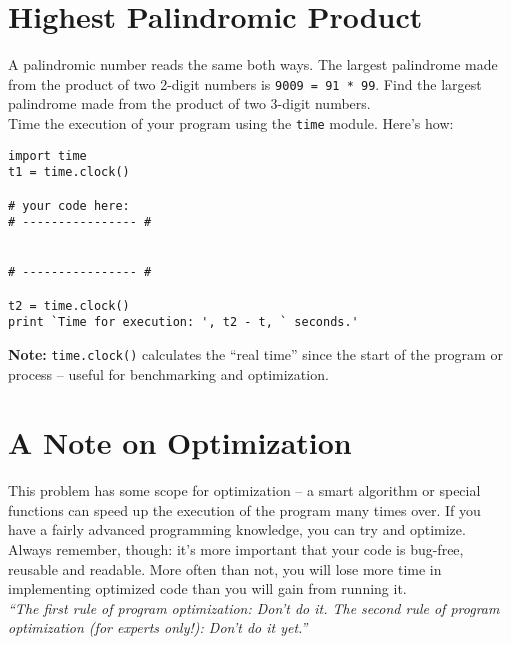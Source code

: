 \documentclass{article}
\begin{document}
\section*{Highest Palindromic Product}

A palindromic number reads the same both ways. The largest palindrome made from
the product of two 2-digit numbers is \texttt{9009 = 91 * 99}. Find the largest 
palindrome made from the product of two 3-digit numbers.
\newline \\ Time the execution of your program using the \texttt{time} module. 
Here's how:
\begin{verbatim}
import time
t1 = time.clock()

# your code here:
# ---------------- #


# ---------------- #

t2 = time.clock()
print `Time for execution: ', t2 - t, ` seconds.'
\end{verbatim}
\textbf{Note: }\texttt{time.clock()} calculates the ``real time'' since the 
start of the program or process -- useful for benchmarking and optimization.

\section*{A Note on Optimization}
This problem has some scope for optimization -- a smart algorithm or special
functions can speed up the execution of the program many times over. If you have 
a fairly advanced programming knowledge, you can try and optimize.
\newline \\ Always remember, though: it's more important that your code is bug-free,
reusable and readable. More often than not, you will lose more time in
implementing optimized code than you will gain from running it.
\newline \\ \emph{``The first rule of program optimization: Don't do it. 
The second rule of program optimization (for experts only!): Don't do it yet.''}
\end{document}
